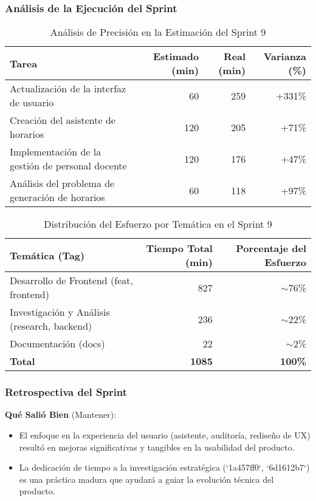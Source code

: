 \subsubsection{Análisis de la Ejecución del Sprint}

\begin{table}[H]
    \caption{Análisis de Precisión en la Estimación del Sprint 9}
    \label{tab:sprint-9-estimation-accuracy}
    \begin{tabularx}{\textwidth}{@{}Xrrr@{}}
        \toprule
        \textbf{Tarea} & \textbf{Estimado (min)} & \textbf{Real (min)} & \textbf{Varianza (\%)} \\
        \midrule
        Actualización de la interfaz de usuario & 60 & 259 & +331\% \\
        Creación del asistente de horarios & 120 & 205 & +71\% \\
        Implementación de la gestión de personal docente & 120 & 176 & +47\% \\
        Análisis del problema de generación de horarios & 60 & 118 & +97\% \\
        \bottomrule
    \end{tabularx}
\end{table}

\begin{table}[H]
    \caption{Distribución del Esfuerzo por Temática en el Sprint 9}
    \label{tab:sprint-9-effort-distribution}
    \begin{tabularx}{\textwidth}{@{}Xrr@{}}
        \toprule
        \textbf{Temática (Tag)} & \textbf{Tiempo Total (min)} & \textbf{Porcentaje del Esfuerzo} \\
        \midrule
        Desarrollo de Frontend (feat, frontend) & 827 & $\sim$76\% \\
        Investigación y Análisis (research, backend) & 236 & $\sim$22\% \\
        Documentación (docs) & 22 & $\sim$2\% \\
        \midrule
        \textbf{Total} & \textbf{1085} & \textbf{100\%} \\
        \bottomrule
    \end{tabularx}
\end{table}

\subsubsection{Retrospectiva del Sprint}

\textbf{Qué Salió Bien} (Mantener):
\begin{itemize}
    \item El enfoque en la experiencia del usuario (asistente, auditoría, rediseño de UX) resultó en mejoras significativas y tangibles en la usabilidad del producto.
    \item La dedicación de tiempo a la investigación estratégica (`1a457ff0`, `6d1612b7`) es una práctica madura que ayudará a guiar la evolución técnica del producto.
\end{itemize}

